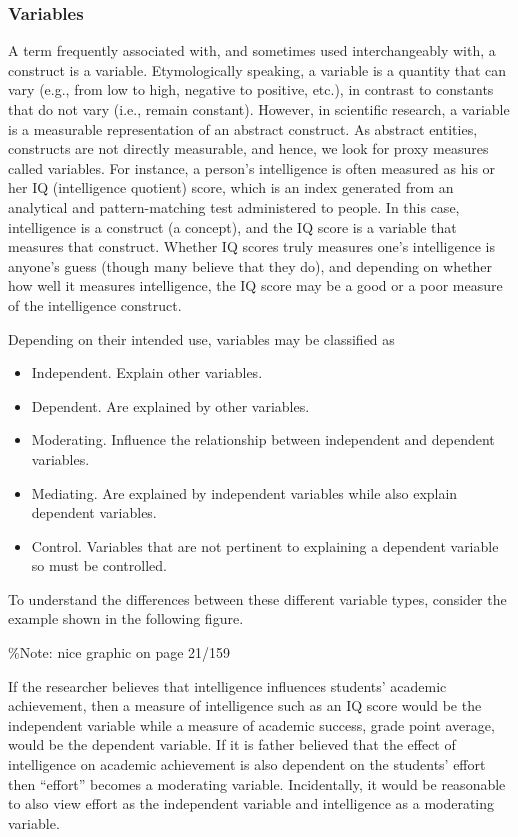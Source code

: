 \documentclass[]{book}
\providecommand{\tightlist}{%
  \setlength{\itemsep}{0pt}\setlength{\parskip}{0pt}}
\theoremstyle{definition}
\theoremstyle{definition}
\theoremstyle{definition}
\theoremstyle{remark}
\begin{document}
\hypertarget{variables}{%
\subsubsection{Variables}\label{variables}}

A term frequently associated with, and sometimes used interchangeably
with, a construct is a variable. Etymologically speaking, a variable is
a quantity that can vary (e.g., from low to high, negative to positive,
etc.), in contrast to constants that do not vary (i.e., remain
constant). However, in scientific research, a variable is a measurable
representation of an abstract construct. As abstract entities,
constructs are not directly measurable, and hence, we look for proxy
measures called variables. For instance, a person's intelligence is
often measured as his or her IQ (intelligence quotient) score, which is
an index generated from an analytical and pattern-matching test
administered to people. In this case, intelligence is a construct (a
concept), and the IQ score is a variable that measures that construct.
Whether IQ scores truly measures one's intelligence is anyone's guess
(though many believe that they do), and depending on whether how well it
measures intelligence, the IQ score may be a good or a poor measure of
the intelligence construct.

Depending on their intended use, variables may be classified as

\begin{itemize}
\tightlist
\item
  Independent. Explain other variables.
\item
  Dependent. Are explained by other variables.
\item
  Moderating. Influence the relationship between independent and
  dependent variables.
\item
  Mediating. Are explained by independent variables while also explain
  dependent variables.
\item
  Control. Variables that are not pertinent to explaining a dependent
  variable so must be controlled.
\end{itemize}

To understand the differences between these different variable types,
consider the example shown in the following figure.

\%Note: nice graphic on page 21/159

If the researcher believes that intelligence influences students'
academic achievement, then a measure of intelligence such as an IQ score
would be the independent variable while a measure of academic success,
grade point average, would be the dependent variable. If it is father
believed that the effect of intelligence on academic achievement is also
dependent on the students' effort then ``effort'' becomes a moderating
variable. Incidentally, it would be reasonable to also view effort as
the independent variable and intelligence as a moderating variable.
\end{document}
